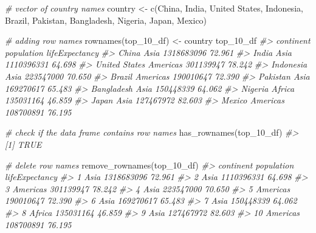 \documentclass[
]{book}
\newenvironment{Shaded}{\begin{snugshade}}{\end{snugshade}}
\newcommand{\CommentTok}[1]{\textcolor[rgb]{0.56,0.35,0.01}{\textit{#1}}}
\newcommand{\FunctionTok}[1]{\textcolor[rgb]{0.00,0.00,0.00}{#1}}
\newcommand{\NormalTok}[1]{#1}
\newcommand{\OtherTok}[1]{\textcolor[rgb]{0.56,0.35,0.01}{#1}}
\newcommand{\StringTok}[1]{\textcolor[rgb]{0.31,0.60,0.02}{#1}}
\begin{document}
\begin{Shaded}
\begin{Highlighting}[]
\CommentTok{\# vector of country names}
\NormalTok{country }\OtherTok{\textless{}{-}} \FunctionTok{c}\NormalTok{(}\StringTok{\textquotesingle{}China\textquotesingle{}}\NormalTok{, }\StringTok{\textquotesingle{}India\textquotesingle{}}\NormalTok{, }\StringTok{\textquotesingle{}United States\textquotesingle{}}\NormalTok{, }\StringTok{\textquotesingle{}Indonesia\textquotesingle{}}\NormalTok{, }\StringTok{\textquotesingle{}Brazil\textquotesingle{}}\NormalTok{, }
             \StringTok{\textquotesingle{}Pakistan\textquotesingle{}}\NormalTok{, }\StringTok{\textquotesingle{}Bangladesh\textquotesingle{}}\NormalTok{, }\StringTok{\textquotesingle{}Nigeria\textquotesingle{}}\NormalTok{, }\StringTok{\textquotesingle{}Japan\textquotesingle{}}\NormalTok{, }\StringTok{\textquotesingle{}Mexico\textquotesingle{}}\NormalTok{)}

\CommentTok{\# adding row names}
\FunctionTok{rownames}\NormalTok{(top\_10\_df) }\OtherTok{\textless{}{-}}\NormalTok{ country}
\NormalTok{top\_10\_df}
\CommentTok{\#\textgreater{}               continent population lifeExpectancy}
\CommentTok{\#\textgreater{} China              Asia 1318683096         72.961}
\CommentTok{\#\textgreater{} India              Asia 1110396331         64.698}
\CommentTok{\#\textgreater{} United States  Americas  301139947         78.242}
\CommentTok{\#\textgreater{} Indonesia          Asia  223547000         70.650}
\CommentTok{\#\textgreater{} Brazil         Americas  190010647         72.390}
\CommentTok{\#\textgreater{} Pakistan           Asia  169270617         65.483}
\CommentTok{\#\textgreater{} Bangladesh         Asia  150448339         64.062}
\CommentTok{\#\textgreater{} Nigeria          Africa  135031164         46.859}
\CommentTok{\#\textgreater{} Japan              Asia  127467972         82.603}
\CommentTok{\#\textgreater{} Mexico         Americas  108700891         76.195}

\CommentTok{\# check if the data frame contains row names}
\FunctionTok{has\_rownames}\NormalTok{(top\_10\_df)}
\CommentTok{\#\textgreater{} [1] TRUE}

\CommentTok{\# delete row names}
\FunctionTok{remove\_rownames}\NormalTok{(top\_10\_df)}
\CommentTok{\#\textgreater{}    continent population lifeExpectancy}
\CommentTok{\#\textgreater{} 1       Asia 1318683096         72.961}
\CommentTok{\#\textgreater{} 2       Asia 1110396331         64.698}
\CommentTok{\#\textgreater{} 3   Americas  301139947         78.242}
\CommentTok{\#\textgreater{} 4       Asia  223547000         70.650}
\CommentTok{\#\textgreater{} 5   Americas  190010647         72.390}
\CommentTok{\#\textgreater{} 6       Asia  169270617         65.483}
\CommentTok{\#\textgreater{} 7       Asia  150448339         64.062}
\CommentTok{\#\textgreater{} 8     Africa  135031164         46.859}
\CommentTok{\#\textgreater{} 9       Asia  127467972         82.603}
\CommentTok{\#\textgreater{} 10  Americas  108700891         76.195}


\end{Highlighting}
\end{Shaded}
\end{document}
